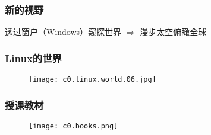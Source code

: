 \begin{frame}
  \frametitle{新的视野}
  \begin{center}
    透过窗户（Windows）窥探世界 $\Longrightarrow$ 漫步太空俯瞰全球
  \end{center}
  \vspace{-1em}
  \begin{figure}
    \centering
    \quad
  \end{figure}
\end{frame}

\begin{frame}
  \frametitle{Linux的世界}
  \begin{figure}
    \centering
    \texttt{[image: c0.linux.world.06.jpg]}
  \end{figure}
\end{frame}

\begin{frame}
  \frametitle{授课教材}
  \begin{figure}
    \centering
    \texttt{[image: c0.books.png]}
  \end{figure}
\end{frame}

